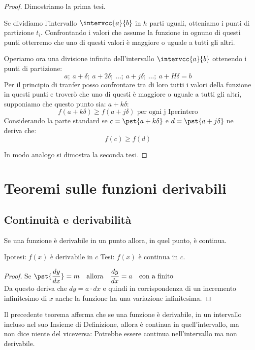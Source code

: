 \vspace{-10mm}                           %
\begin{proof}
Dimostriamo la prima tesi.

Se dividiamo l'intervallo \(\intervcc{a}{b}\) in \(h\) parti uguali, 
otteniamo i punti di partizione \(t_i\). Confrontando i valori che assume 
la funzione in ognuno di questi punti otterremo che uno di questi valori è 
maggiore o uguale a tutti gli altri.

Operiamo ora una divisione infinita dell'intervallo \(\intervcc{a}{b}\)
ottenendo i punti di partizione: 
\[a;~a+\delta;~a+2\delta;~\dots;~a+j\delta;~\dots;~a+H\delta=b\]
Per il principio di tranfer posso confrontare tra di loro tutti i valori 
della funzione in questi punti e troverò che uno di questi è maggiore o 
uguale a tutti gli altri, supponiamo che questo punto sia: \(a+k\delta\):
\[f(a+k\delta) \geqslant f(a+j\delta) \text{ per ogni j Iperintero}\]
Considerando la parte standard 
se \(c=\pst{a+k\delta}\) e \(d=\pst{a+j\delta}\)
ne deriva che:
\[f(c) \geqslant f(d)\]

In modo analogo si dimostra la seconda tesi.
\end{proof}


\section{Teoremi sulle funzioni derivabili}
\label{subsec:cont_definizione}

\subsection{Continuità e derivabilità}
\label{subsec:cont_contderiv}

\begin{teorema}
Se una funzione è derivabile in un punto allora, in quel punto, è continua.
\end{teorema}

\noindent Ipotesi: 
\(f(x) \text{ è derivabile in } c\)
\tab Tesi: 
\(f(x) \text{ è continua in } c\).

\begin{proof}

Se \(\pst{\dfrac{dy}{dx}}=m \quad \text{allora} \quad 
\dfrac{dy}{dx}=a \quad \text{con a finito} \)\\
Da questo deriva che \(dy= a \cdot dx\) e quindi in corrispondenza di 
un incremento infinitesimo di \(x\) anche la funzione ha una 
variazione infinitesima.
\end{proof}
\begin{osservazione}
Il precedente teorema afferma che se una funzione è derivabile, in un 
intervallo incluso nel suo Insieme di Definizione, allora è continua in 
quell'intervallo, ma non dice niente del viceversa: Potrebbe essere 
continua nell'intervallo ma non derivabile.
\end{osservazione}

